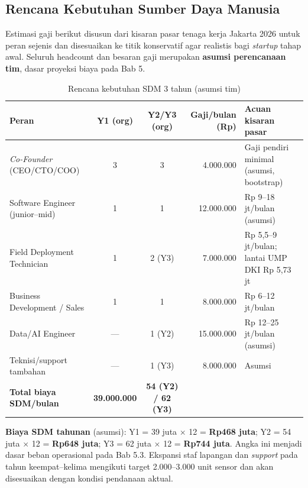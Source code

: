\subsection{Rencana Kebutuhan Sumber Daya Manusia}
\label{sec:4-2}

Estimasi gaji berikut disusun dari kisaran pasar tenaga kerja Jakarta 2026 untuk peran sejenis dan disesuaikan ke titik konservatif agar realistis bagi \textit{startup} tahap awal. Seluruh headcount dan besaran gaji merupakan \textbf{asumsi perencanaan tim}, dasar proyeksi biaya pada Bab 5.

\begin{table}[H]
\footnotesize
\renewcommand{\arraystretch}{0.85}
\begin{tabularx}{\textwidth}{|>{\RaggedRight\arraybackslash}X|c|c|r|>{\RaggedRight\arraybackslash}X|}
\hline
\textbf{Peran} & \textbf{Y1 (org)} & \textbf{Y2/Y3 (org)} & \textbf{Gaji/bulan (Rp)} & \textbf{Acuan kisaran pasar} \\
\hline
\textit{Co-Founder} (CEO/CTO/COO) & 3 & 3 & 4.000.000 & Gaji pendiri minimal (asumsi, bootstrap) \\
\hline
Software Engineer (junior--mid) & 1 & 1 & 12.000.000 & Rp 9--18 jt/bulan (asumsi) \\
\hline
Field Deployment Technician & 1 & 2 (Y3) & 7.000.000 & Rp 5,5--9 jt/bulan; lantai UMP DKI Rp 5,73 jt \parencite{gajiteknisi2026,umpjakarta2026} \\
\hline
Business Development / Sales & 1 & 1 & 8.000.000 & Rp 6--12 jt/bulan \parencite{gajibd2025} \\
\hline
Data/AI Engineer & --- & 1 (Y2) & 15.000.000 & Rp 12--25 jt/bulan (asumsi) \\
\hline
Teknisi/support tambahan & --- & 1 (Y3) & 8.000.000 & Asumsi \\
\hline
\textbf{Total biaya SDM/bulan} & \textbf{39.000.000} & \textbf{54 (Y2) / 62 (Y3)} & & \\
\hline
\end{tabularx}
\caption{Rencana kebutuhan SDM 3 tahun (asumsi tim)}
\end{table}

\textbf{Biaya SDM tahunan} (asumsi): Y1 = 39 juta $\times$ 12 = \textbf{Rp468 juta}; Y2 = 54 juta $\times$ 12 = \textbf{Rp648 juta}; Y3 = 62 juta $\times$ 12 = \textbf{Rp744 juta}. Angka ini menjadi dasar beban operasional pada Bab 5.3. Ekspansi staf lapangan dan \textit{support} pada tahun keempat--kelima mengikuti target 2.000--3.000 unit sensor dan akan disesuaikan dengan kondisi pendanaan aktual.
